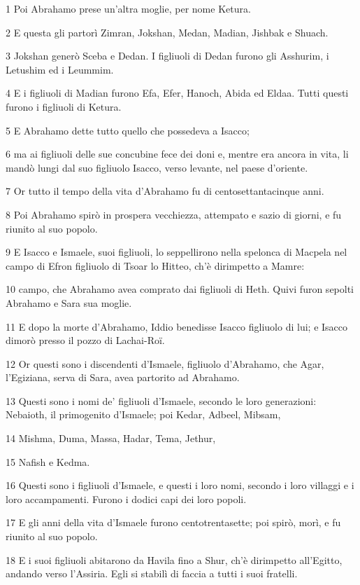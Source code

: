 \par 1 Poi Abrahamo prese un'altra moglie, per nome Ketura.
\par 2 E questa gli partorì Zimran, Jokshan, Medan, Madian, Jishbak e Shuach.
\par 3 Jokshan generò Sceba e Dedan. I figliuoli di Dedan furono gli Asshurim, i Letushim ed i Leummim.
\par 4 E i figliuoli di Madian furono Efa, Efer, Hanoch, Abida ed Eldaa. Tutti questi furono i figliuoli di Ketura.
\par 5 E Abrahamo dette tutto quello che possedeva a Isacco;
\par 6 ma ai figliuoli delle sue concubine fece dei doni e, mentre era ancora in vita, li mandò lungi dal suo figliuolo Isacco, verso levante, nel paese d'oriente.
\par 7 Or tutto il tempo della vita d'Abrahamo fu di centosettantacinque anni.
\par 8 Poi Abrahamo spirò in prospera vecchiezza, attempato e sazio di giorni, e fu riunito al suo popolo.
\par 9 E Isacco e Ismaele, suoi figliuoli, lo seppellirono nella spelonca di Macpela nel campo di Efron figliuolo di Tsoar lo Hitteo, ch'è dirimpetto a Mamre:
\par 10 campo, che Abrahamo avea comprato dai figliuoli di Heth. Quivi furon sepolti Abrahamo e Sara sua moglie.
\par 11 E dopo la morte d'Abrahamo, Iddio benedisse Isacco figliuolo di lui; e Isacco dimorò presso il pozzo di Lachai-Roï.
\par 12 Or questi sono i discendenti d'Ismaele, figliuolo d'Abrahamo, che Agar, l'Egiziana, serva di Sara, avea partorito ad Abrahamo.
\par 13 Questi sono i nomi de' figliuoli d'Ismaele, secondo le loro generazioni: Nebaioth, il primogenito d'Ismaele; poi Kedar, Adbeel, Mibsam,
\par 14 Mishma, Duma, Massa, Hadar, Tema, Jethur,
\par 15 Nafish e Kedma.
\par 16 Questi sono i figliuoli d'Ismaele, e questi i loro nomi, secondo i loro villaggi e i loro accampamenti. Furono i dodici capi dei loro popoli.
\par 17 E gli anni della vita d'Ismaele furono centotrentasette; poi spirò, morì, e fu riunito al suo popolo.
\par 18 E i suoi figliuoli abitarono da Havila fino a Shur, ch'è dirimpetto all'Egitto, andando verso l'Assiria. Egli si stabilì di faccia a tutti i suoi fratelli.
